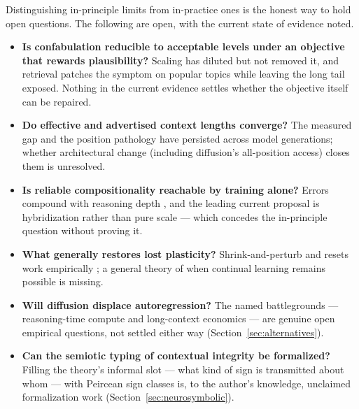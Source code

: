 \documentclass[11pt,a4paper]{article}
\begin{document}
Distinguishing in-principle limits from in-practice ones is the honest way to
hold open questions. The following are open, with the current state of
evidence noted.

\begin{itemize}
\item \textbf{Is confabulation reducible to acceptable levels under an
objective that rewards plausibility?} Scaling has diluted but not removed it,
and retrieval patches the symptom on popular topics
\autocite{mallen2023trust} while leaving the long tail exposed. Nothing in
the current evidence settles whether the objective itself can be repaired.

\item \textbf{Do effective and advertised context lengths converge?} The
measured gap \autocite{hsieh2024ruler} and the position pathology
\autocite{liu2024lost} have persisted across model generations; whether
architectural change (including diffusion's all-position access) closes them
is unresolved.

\item \textbf{Is reliable compositionality reachable by training alone?}
Errors compound with reasoning depth \autocite{dziri2023faith}, and the
leading current proposal is hybridization rather than pure scale
\autocite{kambhampati2024llms} --- which concedes the in-principle question
without proving it.

\item \textbf{What generally restores lost plasticity?} Shrink-and-perturb
and resets work empirically \autocite{dohare2024plasticity,nikishin2022primacy};
a general theory of when continual learning remains possible is missing.

\item \textbf{Will diffusion displace autoregression?} The named
battlegrounds --- reasoning-time compute and long-context economics --- are
genuine open empirical questions, not settled either way
(Section~\ref{sec:alternatives}).

\item \textbf{Can the semiotic typing of contextual integrity be
formalized?} Filling the theory's informal slot --- what kind of sign is
transmitted about whom --- with Peircean sign classes is, to the author's
knowledge, unclaimed formalization work
(Section~\ref{sec:neurosymbolic}).


\end{itemize}
\end{document}
